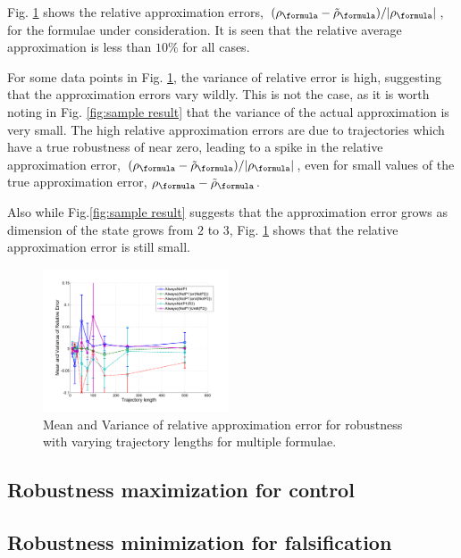 Fig. \ref{fig:relative error} shows the relative approximation errors, $(\robf-\srobf)/|\robf|$, for the formulae under consideration. It is seen that the relative average approximation is less than $10\%$ for all cases. 

For some data points in Fig. \ref{fig:relative error}, the variance of relative error is high, suggesting that the approximation errors vary wildly. This is not the case, as it is worth noting in Fig. \ref{fig:sample result} that the variance of the actual approximation is very small. The high relative approximation errors are due to trajectories which have a true robustness of near zero, leading to a spike in the relative approximation error, $(\robf-\srobf)/|\robf|$, even for small values of the true approximation error, $\robf-\srobf$.

Also while Fig.\ref{fig:sample result} suggests that the approximation error grows as dimension of the state grows from $2$ to $3$, Fig. \ref{fig:relative error} shows that the relative approximation error is still small. 

\begin{figure}[t]
\centering
\includegraphics[width=0.49\textwidth]{figures/RobustnessErrorRel}
\caption{Mean and Variance of relative approximation error for robustness with varying trajectory lengths for multiple formulae.}
\label{fig:relative error}
\end{figure}


\subsection{Robustness maximization for control}
\label{sec:toy example}


\subsection{Robustness minimization for falsification}
\label{sec:toy falsification}
